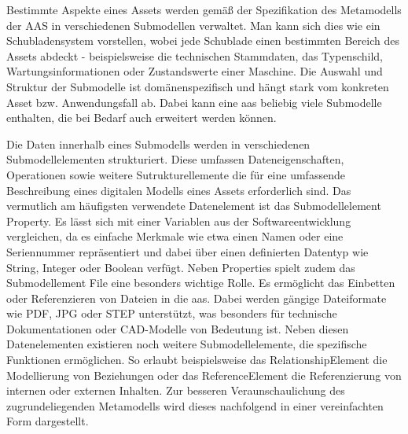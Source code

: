 Bestimmte Aspekte eines Assets werden gemäß der Spezifikation des Metamodells der AAS \cite{SpezifikationPart1} in verschiedenen Submodellen verwaltet.
Man kann sich dies wie ein Schubladensystem vorstellen, wobei jede Schublade einen bestimmten Bereich des Assets abdeckt - beispielsweise die technischen Stammdaten, das Typenschild, Wartungsinformationen oder Zustandswerte einer Maschine.
Die Auswahl und Struktur der Submodelle ist domänenspezifisch und hängt stark vom konkreten Asset bzw. Anwendungsfall ab. 
Dabei kann eine \acs{aas} beliebig viele Submodelle enthalten, die bei Bedarf auch erweitert werden können. 

Die Daten innerhalb eines Submodells werden in verschiedenen Submodellelementen strukturiert.
Diese umfassen Dateneigenschaften, Operationen sowie weitere Sutrukturellemente die für eine umfassende Beschreibung eines digitalen Modells eines Assets erforderlich sind.
Das vermutlich am häufigsten verwendete Datenelement ist das Submodellelement Property.
Es lässt sich mit einer Variablen aus der Softwareentwicklung vergleichen, da es einfache Merkmale wie etwa einen Namen oder eine Seriennummer repräsentiert und dabei über einen definierten Datentyp wie String, Integer oder Boolean verfügt.
Neben Properties spielt zudem das Submodellement File eine besonders wichtige Rolle. Es ermöglicht das Einbetten oder Referenzieren von Dateien in die \acs{aas}. 
Dabei werden gängige Dateiformate wie PDF, JPG oder STEP unterstützt, was besonders für technische Dokumentationen oder CAD-Modelle von Bedeutung ist.
Neben diesen Datenelementen existieren noch weitere Submodellelemente, die spezifische Funktionen ermöglichen. 
So erlaubt beispielsweise das RelationshipElement die Modellierung von Beziehungen oder das ReferenceElement die Referenzierung von internen oder externen Inhalten.
Zur besseren Veraunschaulichung des zugrundeliegenden Metamodells wird dieses nachfolgend in einer vereinfachten Form dargestellt.





